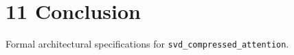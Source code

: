\section{11 Conclusion}

Formal architectural specifications for \texttt{svd_compressed_attention}.
